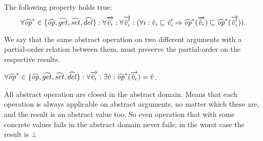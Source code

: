 \begin{assumption}
\label{asm:mono-abs}
The following property holds true:
\[
\forall \widehat{\mathit{op}}^* \in \{\widehat{\mathit{op}},\widehat{get},\widehat{set},\widehat{del}\}: \forall \overrightarrow{\hat{v}_i}: \forall \overrightarrow{\hat{v}_i'}: (\forall i: \hat{v}_i \sqsubseteq \hat{v}_i' \Rightarrow \widehat{\mathit{op}}^*(\overrightarrow{\hat{v}_i}) \sqsubseteq \widehat{\mathit{op}}^*(\overrightarrow{\hat{v}_i'})).
\]
\end{assumption}
We say that the same abstract operation on two different arguments with a partial-order relation between them, must preserve the partial-order on the respective results.

\begin{assumption}
\label{asm:totality-abs}
$\forall \widehat{\mathit{op}}^* \in \{\widehat{\mathit{op}},\widehat{get},\widehat{set},\widehat{del}\}: \forall \overrightarrow{\hat{v}_i}: \exists \hat{v}: \widehat{\mathit{op}}^*(\overrightarrow{\hat{v}_i}) = \hat{v}$.
\end{assumption}
All abstract operation are closed in the abstract domain. Means that each operation is always applicable on abstract arguments, no matter which these are, and the result is an abstract value too. So even operation that with some concrete values fails in the abstract domain never fails; in the worst case the result is $\bot$


